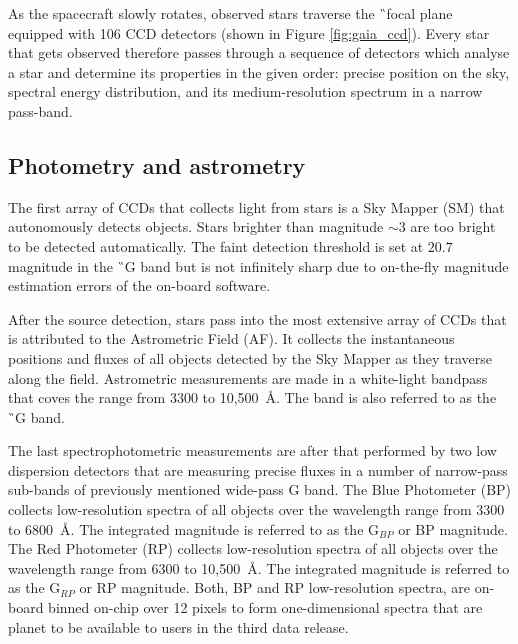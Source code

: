 As the spacecraft slowly rotates, observed stars traverse the \G\ focal plane equipped with 106 CCD detectors (shown in Figure \ref{fig:gaia_ccd}). Every star that gets observed therefore passes through a sequence of detectors which analyse a star and determine its properties in the given order: precise position on the sky, spectral energy distribution, and its medium-resolution spectrum in a narrow pass-band.

\subsection{Photometry and astrometry}
The first array of CCDs that collects light from stars is a Sky Mapper (SM) that autonomously detects objects. Stars brighter than magnitude $\sim3$ are too bright to be detected automatically. The faint detection threshold is set at $20.7$ magnitude in the \G\ G band but is not infinitely sharp due to on-the-fly magnitude estimation errors of the on-board software.

After the source detection, stars pass into the most extensive array of CCDs that is attributed to the Astrometric Field (AF). It collects the instantaneous positions and fluxes of all objects detected by the Sky Mapper as they traverse along the field. Astrometric measurements are made in a white-light bandpass that coves the range from 3300 to 10,500~\AA. The band is also referred to as the \G\ G band.

The last spectrophotometric measurements are after that performed by two low dispersion detectors that are measuring precise fluxes in a number of narrow-pass sub-bands of previously mentioned wide-pass G band. The Blue Photometer (BP) collects low-resolution spectra of all objects over the wavelength range from 3300 to 6800~\AA. The integrated magnitude is referred to as the G$_{BP}$ or BP magnitude. The Red Photometer (RP) collects low-resolution spectra of all objects over the wavelength range from 6300 to 10,500~\AA. The integrated magnitude is referred to as the G$_{RP}$ or RP magnitude. Both, BP and RP low-resolution spectra, are on-board binned on-chip over 12 pixels to form one-dimensional spectra that are planet to be available to users in the third data release.

